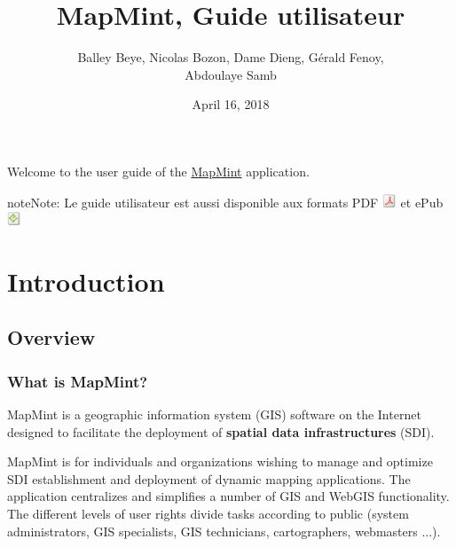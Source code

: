 \documentclass[letterpaper,10pt,english]{sphinxmanual}
\title{MapMint, Guide utilisateur}
\date{April 16, 2018}
\author{Balley Beye, Nicolas Bozon, Dame Dieng, Gérald Fenoy, \\Abdoulaye Samb}
\begin{document}
\maketitle
\tableofcontents
{}\label{index::doc}


Welcome to the user guide of the \href{http://mapmint.com}{MapMint} application.

\begin{notice}{note}{Note:}
Le guide utilisateur est aussi disponible aux formats
PDF \includegraphics{pdf.png}  et ePub \includegraphics{epub.png}
\end{notice}


\chapter{Introduction}
\label{introduction/index:table-des-matieres}\label{introduction/index:home}\label{introduction/index::doc}\label{introduction/index:dashboard}\label{introduction/index:introduction}

\section{Overview}
\label{introduction/introduction:generalites}\label{introduction/introduction::doc}\label{introduction/introduction:userguidegeneral}

\subsection{What is MapMint?}
\label{introduction/introduction:quest-ce-que-mapmint}
MapMint is a geographic information system (GIS) software on the Internet designed to facilitate the deployment of  \textbf{spatial data infrastructures} (SDI).

MapMint is for individuals and organizations wishing to manage and optimize SDI establishment and deployment of dynamic mapping applications. The application centralizes and simplifies a number of GIS and WebGIS functionality. The different levels of user rights divide tasks according to public (system administrators, GIS specialists, GIS technicians, cartographers, webmasters ...).
\end{document}
